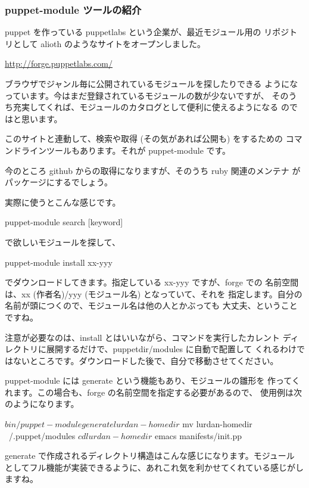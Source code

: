 \documentclass[mingoth,a4paper]{jsarticle}
\begin{document}
\subsubsection{puppet-module ツールの紹介}

puppet を作っている puppetlabs という企業が、最近モジュール用の
リポジトリとして alioth のようなサイトをオープンしました。

\url{http://forge.puppetlabs.com/}

ブラウザでジャンル毎に公開されているモジュールを探したりできる
ようになっています。今はまだ登録されているモジュールの数が少ないですが、
そのうち充実してくれば、モジュールのカタログとして便利に使えるようになる
のではと思います。

このサイトと連動して、検索や取得 (その気があれば公開も) をするための
コマンドラインツールもあります。それが puppet-module です。

今のところ github からの取得になりますが、そのうち ruby 関連のメンテナ
がパッケージにするでしょう。

実際に使うとこんな感じです。

\begin{commandline}
puppet-module search [keyword]
\end{commandline}
で欲しいモジュールを探して、

\begin{commandline}
puppet-module install xx-yyy
\end{commandline}

でダウンロードしてきます。指定している xx-yyy ですが、forge での
名前空間は、xx (作者名)/yyy (モジュール名) となっていて、それを
指定します。自分の名前が頭につくので、モジュール名は他の人とかぶっても
大丈夫、ということですね。

注意が必要なのは、install とはいいながら、コマンドを実行したカレント
ディレクトリに展開するだけで、puppetdir/modules に自動で配置して
くれるわけではないところです。ダウンロードした後で、自分で移動させてください。

puppet-module には generate という機能もあり、モジュールの雛形を
作ってくれます。この場合も、forge の名前空間を指定する必要があるので、
使用例は次のようになります。

\begin{commandline}
$ bin/puppet-module generate lurdan-homedir
$ mv lurdan-homedir ~/.puppet/modules
$ cd lurdan-homedir
$ emacs manifests/init.pp
\end{commandline}

generate で作成されるディレクトリ構造はこんな感じになります。モジュール
としてフル機能が実装できるように、あれこれ気を利かせてくれている感じがし
ますね。
\end{document}
